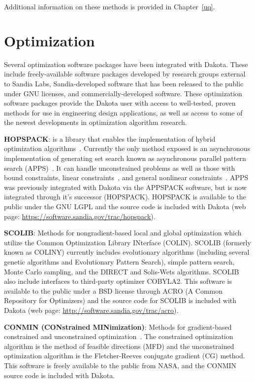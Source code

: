 Additional information on these methods is provided in Chapter~\ref{uq}.

\section{Optimization}\label{capabilities:optimization1}

Several optimization software packages have been integrated with
Dakota. These include freely-available software packages developed by
research groups external to Sandia Labs, Sandia-developed software
that has been released to the public under GNU licenses, and
commercially-developed software. These optimization software packages
provide the Dakota user with access to well-tested, proven methods for
use in engineering design applications, as well as access to some of
the newest developments in optimization algorithm research.

\textbf{HOPSPACK}: is a library that enables the implementation of
hybrid optimization algorithms~\cite{Plantenga2009}.  Currently the
only method exposed is an asynchronous implementation of generating
set search known as asynchronous parallel pattern search
(APPS)~\cite{GrKo06}.  It can handle unconstrained problems as well as
those with bound constraints, linear constraints~\cite{GrKoLe08}, and
general nonlinear constraints~\cite{GrKo07}.  APPS was previously
integrated with Dakota via the APPSPACK software, but is now
integrated through it's successor (HOPSPACK).  HOPSPACK is available
to the public under the GNU LGPL and the source code is included with
Dakota (web page: \url{https://software.sandia.gov/trac/hopspack}).

\textbf{SCOLIB}: Methods for nongradient-based local and global
optimization which utilize the Common Optimization Library INterface
(COLIN). %
SCOLIB
(formerly known as COLINY) currently includes evolutionary algorithms
(including several genetic algorithms and Evolutionary Pattern
Search), simple pattern search, Monte Carlo sampling, and the DIRECT
and Solis-Wets algorithms. SCOLIB also include interfaces to
third-party optimizer COBYLA2.  This software is available to the
public under a BSD license through ACRO (A Common Repository for
Optimizers) and the source code for SCOLIB is included with Dakota
(web page: \url{http://software.sandia.gov/trac/acro}).

\textbf{CONMIN (CONstrained MINimization)}: Methods for gradient-based
constrained and unconstrained optimization~\cite{Van78}. The constrained
optimization algorithm is the method of feasible directions (MFD) and
the unconstrained optimization algorithm is the Fletcher-Reeves
conjugate gradient (CG) method. This software is freely available to
the public from NASA, and the CONMIN source code is included with
Dakota.


